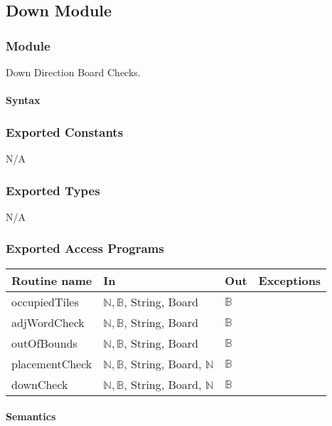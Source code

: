 \documentclass[12pt]{article}
\begin{document}
\subsection*{Down Module}

\subsubsection*{Module}

Down Direction Board Checks.

\paragraph*{Syntax}

\subsubsection*{Exported Constants}
N/A
\subsubsection*{Exported Types}

N/A

\subsubsection* {Exported Access Programs}

\begin{tabular}{| l | l | l | l |}
\hline
\textbf{Routine name} & \textbf{In} & \textbf{Out} & \textbf{Exceptions}\\
\hline
occupiedTiles & $\mathbb{N}, \mathbb{B}$, String, Board & $\mathbb{B}$ & \\
\hline
adjWordCheck & $\mathbb{N}, \mathbb{B}$, String, Board & $\mathbb{B}$ & \\
\hline
outOfBounds & $\mathbb{N}, \mathbb{B}$, String, Board & $\mathbb{B}$ & \\
\hline
placementCheck & $\mathbb{N}, \mathbb{B}$, String, Board, $\mathbb{N}$ & $\mathbb{B}$ & \\
\hline
downCheck & $\mathbb{N}, \mathbb{B}$, String, Board, $\mathbb{N}$ & $\mathbb{B}$ & \\
\hline
\end{tabular}

\paragraph* {Semantics}
\end{document}
